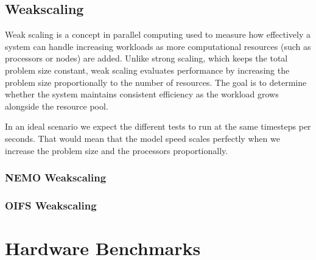 \documentclass[11pt,a4paper,oldfontcommands]{article}
\begin{document}
\subsection{Weakscaling}
Weak scaling is a concept in parallel computing used to measure how effectively a system can handle increasing workloads as more computational resources (such as processors or nodes) are added. Unlike strong scaling, which keeps the total problem size constant, weak scaling evaluates performance by increasing the problem size proportionally to the number of resources. The goal is to determine whether the system maintains consistent efficiency as the workload grows alongside the resource pool.

In an ideal scenario we expect the different tests to run at the same timesteps per seconds. That would mean that the model speed scales perfectly when we increase the problem size and the processors proportionally.

\begin{table}[H]
\centering
\caption{Weakscaling case comparison scalability.}
\end{table}

\subsubsection{NEMO Weakscaling}

\begin{table}[H]
\centering
\caption{NEMO Weakscaling case comparison scalability.}
\end{table}

\subsubsection{OIFS Weakscaling}

\begin{table}[H]
\centering
\caption{OIFS Weakscaling case comparison scalability.}
\end{table}

\clearpage
\section{Hardware Benchmarks}
\end{document}

